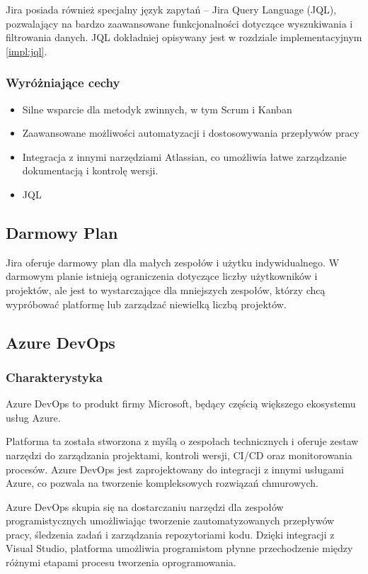 Jira posiada również specjalny język zapytań -- Jira Query Language (JQL), pozwalający na bardzo zaawansowane funkcjonalności dotyczące wyszukiwania i filtrowania danych.
JQL dokładniej opisywany jest w rozdziale implementacyjnym \ref{impl:jql}.
\subsubsection*{Wyróżniające cechy}
\begin{itemize}
    \item Silne wsparcie dla metodyk zwinnych, w tym Scrum i Kanban
    \item Zaawansowane możliwości automatyzacji i dostosowywania przepływów pracy
    \item Integracja z innymi narzędziami Atlassian, co umożliwia łatwe zarządzanie dokumentacją i kontrolę wersji.
    \item JQL
\end{itemize}
\subsection*{Darmowy Plan}
Jira oferuje darmowy plan dla małych zespołów i użytku indywidualnego. W darmowym planie istnieją ograniczenia dotyczące liczby użytkowników i projektów, ale jest to wystarczające dla mniejszych zespołów, którzy chcą wypróbować platformę lub zarządzać niewielką liczbą projektów.

\subsection{Azure DevOps}
\subsubsection*{Charakterystyka}
Azure DevOps to produkt firmy Microsoft, będący częścią większego ekosystemu usług Azure.

Platforma ta została stworzona z myślą o zespołach technicznych i oferuje zestaw narzędzi do zarządzania projektami, kontroli wersji, CI/CD oraz monitorowania procesów. Azure DevOps jest zaprojektowany do integracji
z innymi usługami Azure, co pozwala na tworzenie kompleksowych rozwiązań chmurowych.

Azure DevOps skupia się na dostarczaniu narzędzi dla zespołów programistycznych umożliwiając tworzenie zautomatyzowanych przepływów pracy, śledzenia zadań i zarządzania repozytoriami kodu. Dzięki integracji z Visual Studio,
platforma umożliwia programistom płynne przechodzenie między różnymi etapami procesu tworzenia oprogramowania.
